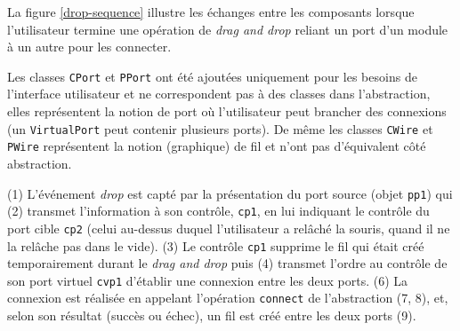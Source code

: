 La figure \ref{drop-sequence} illustre les échanges entre les composants lorsque
l'utilisateur termine une opération de \emph{drag and drop} reliant
un port d'un module à un autre pour les connecter.

Les classes \verb!CPort! et \verb!PPort! ont été ajoutées
uniquement pour les besoins de l'interface utilisateur et ne
correspondent pas à des classes dans l'abstraction, elles
représentent la notion de port où l'utilisateur peut brancher des
connexions (un \verb!VirtualPort! peut contenir plusieurs ports).
De même les classes \verb!CWire! et \verb!PWire! représentent la
notion (graphique) de fil et n'ont pas d'équivalent côté abstraction.

(1) L'événement \emph{drop} est capté par la présentation du port
source (objet \verb!pp1!) qui (2) transmet l'information à son
contrôle, \verb!cp1!, en lui indiquant le contrôle du port cible
\verb!cp2! (celui au-dessus duquel l'utilisateur a relâché la
souris, quand il ne la relâche pas dans le vide). (3) Le contrôle
\verb!cp1! supprime le fil qui était créé temporairement durant le
\emph{drag and drop} puis (4) transmet l'ordre au contrôle de son port
virtuel \verb!cvp1! d'établir une connexion entre les deux ports.
(6) La connexion est réalisée en appelant l'opération \verb!connect! de
l'abstraction (7, 8), et, selon son résultat (succès ou échec), un fil est
créé entre les deux ports (9).
